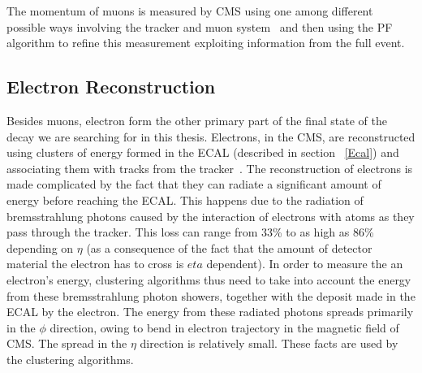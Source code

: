 The momentum of muons is measured by CMS using one among different possible ways involving the tracker and muon system~\cite{muon_recon2012} and then using the PF algorithm to refine this measurement exploiting information from the full event.



\subsection{Electron Reconstruction}
\label{e_recon}
Besides muons, electron form the other primary part of the final state of the decay we are searching for in this thesis. Electrons, in the CMS, are reconstructed using clusters of energy formed in the ECAL (described in section ~\ref{Ecal}) and associating them with tracks from the tracker~\cite{e_recon}. The reconstruction of electrons is made complicated by the fact that they can radiate a significant amount of energy before reaching the ECAL. This happens due to the radiation of bremsstrahlung photons caused by the interaction of electrons with atoms as they pass through the tracker. This loss can range from 33\% to as high as 86\% depending on $\eta$ (as a consequence of the fact that the amount of detector material the electron has to cross is $eta$ dependent). In order to measure the an electron's energy,  clustering algorithms thus need to take into account the energy from these bremsstrahlung photon showers, together with the deposit made in the ECAL by the electron. The energy from these radiated photons spreads primarily in the $\phi$ direction, owing to bend in electron trajectory in the magnetic field of CMS. The spread in the $\eta$ direction is relatively small. These facts are used by the clustering algorithms.

